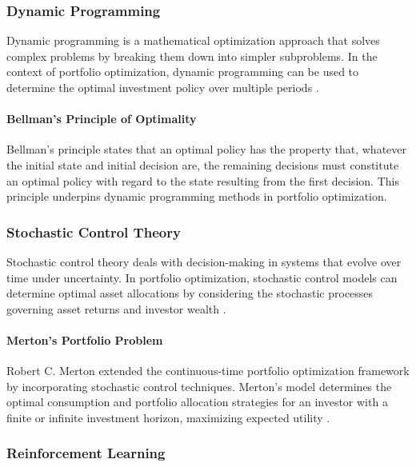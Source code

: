 \subsubsection{Dynamic Programming}

Dynamic programming is a mathematical optimization approach that solves complex problems by breaking them down into simpler subproblems. In the context of portfolio optimization, dynamic programming can be used to determine the optimal investment policy over multiple periods \cite{bellman1957dynamic}.

\paragraph{Bellman's Principle of Optimality}

Bellman's principle states that an optimal policy has the property that, whatever the initial state and initial decision are, the remaining decisions must constitute an optimal policy with regard to the state resulting from the first decision. This principle underpins dynamic programming methods in portfolio optimization.

\subsubsection{Stochastic Control Theory}

Stochastic control theory deals with decision-making in systems that evolve over time under uncertainty. In portfolio optimization, stochastic control models can determine optimal asset allocations by considering the stochastic processes governing asset returns and investor wealth \cite{merton1969lifetime}.

\paragraph{Merton's Portfolio Problem}

Robert C. Merton extended the continuous-time portfolio optimization framework by incorporating stochastic control techniques. Merton's model determines the optimal consumption and portfolio allocation strategies for an investor with a finite or infinite investment horizon, maximizing expected utility \cite{merton1971optimum}.

\subsubsection{Reinforcement Learning}

